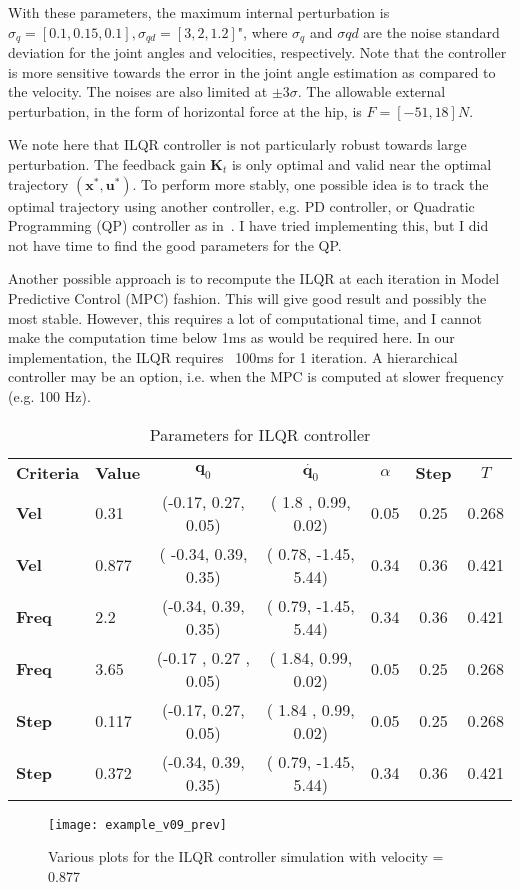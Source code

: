 With these parameters, the maximum internal perturbation is $\sigma_q = [0.1, 0.15, 0.1 ], \sigma_{qd} = [3, 2, 1.2]$", where $\sigma_q$ and $\sigma{qd}$ are the noise standard deviation for the joint angles and velocities, respectively. Note that the controller is more sensitive towards the error in the joint angle estimation as compared to the velocity. The noises are also limited at $\pm 3\sigma$. The allowable external perturbation, in the form of horizontal force at the hip, is $F = [-51, 18] N$. 

We note here that ILQR controller is not particularly robust towards large perturbation. The feedback gain $\bm{K}_t$ is only optimal and valid near the optimal trajectory $(\bm{x}^*, \bm{u}^*)$. To perform more stably, one possible idea is to track the optimal trajectory using another controller, e.g. PD controller, or Quadratic Programming (QP) controller as in~\cite{park2017high}. I have tried implementing this, but I did not have time to find the good parameters for the QP. 

Another possible approach is to recompute the ILQR at each iteration in Model Predictive Control (MPC) fashion. This will give good result and possibly the most stable. However, this requires a lot of computational time, and I cannot make the computation time below 1ms as would be required here. In our implementation, the ILQR requires ~100ms for 1 iteration. A hierarchical controller may be an option, i.e. when the MPC is computed at slower frequency (e.g. 100 Hz). 


\renewcommand{\arraystretch}{1.}
\begin{table}[h!]
	\centering    
      \caption{Parameters for ILQR controller}
      \label{tab:ilqr_result}
		
	\begin{tabular}{l l | c  c  c c c}
		\toprule
\bf{Criteria} & \bf{Value} & $\bm{q}_0$ & $\dot{\bm{q}_0}$ & $\alpha$ &  \bf{Step} & $T$\\
\bf{Vel} & 0.31 & (-0.17,  0.27,  0.05) & (  1.8 ,  0.99,  0.02) &   0.05 & 0.25 & 0.268 \\
\bf{Vel} & 0.877 &( -0.34,  0.39,  0.35) & (  0.78, -1.45,  5.44) &   0.34&       0.36 & 0.421\\
\bf{Freq} & 2.2 & (-0.34,  0.39,  0.35) & ( 0.79, -1.45,  5.44) &   0.34&0.36 &0.421  \\
\bf{Freq} & 3.65 & (-0.17 ,  0.27 ,  0.05) & (  1.84,  0.99,  0.02) &   0.05 &        0.25 &0.268 \\
\bf{Step} & 0.117 &(-0.17,  0.27,  0.05) & (  1.84 ,  0.99,  0.02) &  0.05& 0.25& 0.268\\
\bf{Step} & 0.372 &(-0.34,  0.39,  0.35) & (  0.79, -1.45,  5.44) &   0.34& 0.36& 0.421 
	\end{tabular}
\end{table}




\begin{figure}
\texttt{[image: example\_v09\_prev]}
\caption{Various plots for the ILQR controller simulation with velocity = 0.877}
\label{fig:ilqr_plot}
\end{figure}

